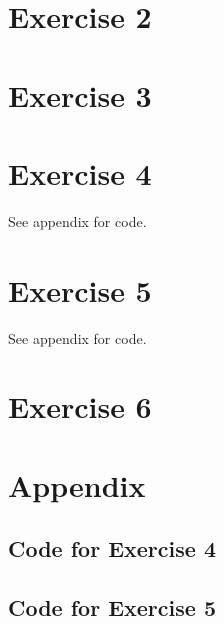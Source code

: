 \documentclass[12pt]{article}
\begin{document}
\section*{Exercise 2}

\section*{Exercise 3}

\section*{Exercise 4}
See \refname{appendix} for code.


\section*{Exercise 5}
See \refname{appendix} for code.



\section*{Exercise 6}


\section*{Appendix}\label{appendix}
\subsection*{Code for Exercise 4}

\subsection*{Code for Exercise 5}

\end{document}

